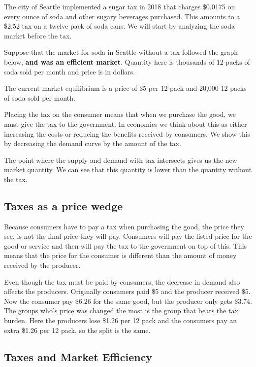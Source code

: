 \documentclass[
]{book}
\begin{document}
The city of Seattle implemented a sugar tax in 2018 that charges \$0.0175 on every ounce of soda and other sugary beverages purchased. This amounts to a \$2.52 tax on a twelve pack of soda cans. We will start by analyzing the soda market before the tax.

Suppose that the market for soda in Seattle without a tax followed the graph below, \textbf{and was an efficient market}. Quantity here is thousands of 12-packs of soda sold per month and price is in dollars.

The current market equilibrium is a price of \$5 per 12-pack and 20,000 12-packs of soda sold per month.

Placing the tax on the consumer means that when we purchase the good, we must give the tax to the government. In economics we think about this as either increasing the costs or reducing the benefits received by consumers. We show this by decreasing the demand curve by the amount of the tax.

The point where the supply and demand with tax intersects gives us the new market quantity. We can see that this quantity is lower than the quantity without the tax.

\subsection{Taxes as a price wedge}\label{taxes-as-a-price-wedge}

Because consumers have to pay a tax when purchasing the good, the price they see, is not the final price they will pay. Consumers will pay the listed price for the good or service and then will pay the tax to the government on top of this. This means that the price for the consumer is different than the amount of money received by the producer.

Even though the tax must be paid by consumers, the decrease in demand also affects the producers. Originally consumers paid \$5 and the producer received \$5. Now the consumer pay \$6.26 for the same good, but the producer only gets \$3.74. The groups who's price was changed the most is the group that bears the tax burden. Here the producers lose \$1.26 per 12 pack and the consumers pay an extra \$1.26 per 12 pack, so the split is the same.

\subsection{Taxes and Market Efficiency}\label{taxes-and-market-efficiency}
\end{document}
